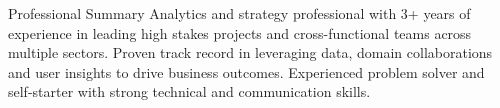 \documentclass{resume} %
\begin{document}

\begin{rSection}{Professional Summary}
Analytics and strategy professional with 3+ years of experience in leading high stakes projects and cross-functional teams across multiple sectors. Proven track record in leveraging data, domain collaborations and user insights to drive business outcomes. Experienced problem solver and self-starter with strong technical and communication skills.
\end{rSection}

\end{document}

